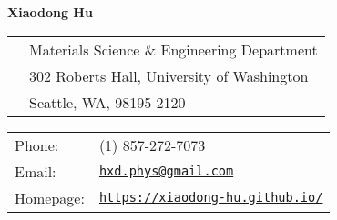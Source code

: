 \documentclass[10pt, letterpaper]{article}
\def\name{Xiaodong Hu}
\begin{document}
\vspace{-2in}
{\huge\bf\name}
\hfill\\

\begin{minipage}{0.5\linewidth}
    \begin{tabular}{ll}
         & Materials Science \& Engineering Department \\
         & 302 Roberts Hall, University of Washington  \\
         & Seattle, WA, 98195-2120
    \end{tabular}
\end{minipage}
\begin{minipage}{0.5\linewidth}
    \begin{tabular}{ll}
        Phone:    & (1) 857-272-7073                                                          \\
        Email:    & \href{mailto:hxd.phys@gmail.com}{\tt hxd.phys@gmail.com}                  \\
        Homepage: & \href{https://xiaodong-hu.github.io/}{\tt https://xiaodong-hu.github.io/} \\
    \end{tabular}
\end{minipage}

\makebox[\linewidth]{\rule{\linewidth}{1.0pt}}

\vspace{-0.5em}
\end{document}
